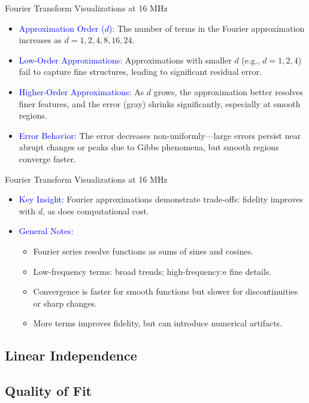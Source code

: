 \begin{frame}{Fourier Transform Visualizations at 16 MHz}
    \small
    \begin{itemize}
        \item \textcolor{blue}{Approximation Order (\(d\)):} 
              The number of terms in the Fourier approximation increases as \(d = 1, 2, 4, 8, 16, 24\).
        \item \textcolor{blue}{Low-Order Approximations:} 
              Approximations with smaller \(d\) (e.g., \(d = 1, 2, 4\)) fail to capture fine structures, leading to significant residual error.
        \item \textcolor{blue}{Higher-Order Approximations:} 
              As \(d\) grows, the approximation better resolves finer features, and the error (gray) shrinks significantly, especially at smooth regions.
        \item \textcolor{blue}{Error Behavior:} 
              The error decreases non-uniformly—large errors persist near abrupt changes or peaks due to Gibbs phenomena, but smooth regions converge faster.
    \end{itemize}
\end{frame}

\begin{frame}{Fourier Transform Visualizations at 16 MHz}
    \small
    \begin{itemize}
        \item \textcolor{blue}{Key Insight:} 
              Fourier approximations demonstrate trade-offs: fidelity improves with \(d\), as does computational cost.
        \item \textcolor{blue}{General Notes:}
              \begin{itemize}
                  \item Fourier series resolve functions as sums of sines and cosines.
                  \item Low-frequency terms: broad trends; high-frequency:e fine details.
                  \item Convergence is faster for smooth functions but slower for discontinuities or sharp changes.
                  \item More terms improves fidelity, but can introduce numerical artifacts.
              \end{itemize}
    \end{itemize}
\end{frame}


\subsection{Linear Independence}
	
\subsection{Quality of Fit}

\endinput  %

